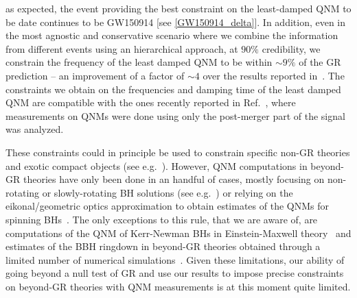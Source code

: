 

 as expected, the event providing the best constraint
on the least-damped QNM to be date continues to be GW150914 [see
\eqref{GW150914_delta}]. In addition, even in the most agnostic and
conservative scenario where we combine the information from different
events using an hierarchical approach, at $90\%$ credibility, we
constrain the frequency of the least damped QNM to be within $\sim
9\%$ of the GR prediction -- an improvement of a factor of $\sim 4$
over the results reported in~\cite{Abbott:2020jks}. The constraints we
obtain on the frequencies and damping time of the least damped QNM are
compatible with the ones recently reported in
Ref.~\cite{Carullo:2021dui}, where measurements on QNMs were done
using only the post-merger part of the signal was analyzed.

These constraints could in principle be used to constrain specific
non-GR theories and exotic compact objects (see
e.g.~\cite{Glampedakis:2017cgd,Cardoso:2019rvt,Maggio:2020jml}). However,
QNM computations in beyond-GR theories have only been done in an
handful of cases, mostly focusing on non-rotating or slowly-rotating
BH solutions (see
e.g.~\cite{Ferrari:2000ep,Molina:2010fb,Pani:2009wy,Blazquez-Salcedo:2016enn,Blazquez-Salcedo:2017txk,Brito:2018hjh,Franciolini:2018uyq,Cardoso:2018ptl,Tattersall:2018nve,Tattersall:2019nmh,Blazquez-Salcedo:2019nwd,Silva:2019scu,Glampedakis:2019dqh,Blazquez-Salcedo:2020jee,Blazquez-Salcedo:2020caw,Cano:2020cao})
or relying on the eikonal/geometric optics approximation to obtain
estimates of the QNMs for spinning
BHs~\cite{Blazquez-Salcedo:2016enn,Glampedakis:2017dvb,Jai-akson:2017ldo}. The
only exceptions to this rule, that we are aware of, are computations
of the QNM of Kerr-Newman BHs in Einstein-Maxwell
theory~\cite{Pani:2013ija,Pani:2013wsa,Mark:2014aja,Dias:2015wqa} and
estimates of the BBH ringdown in beyond-GR theories obtained through a
limited number of numerical
simulations~\cite{Okounkova:2019dfo,Okounkova:2019zjf}. Given these
limitations, our ability of going beyond a null test of GR and use our
results to impose precise constraints on beyond-GR theories with QNM
measurements is at this moment quite limited.

